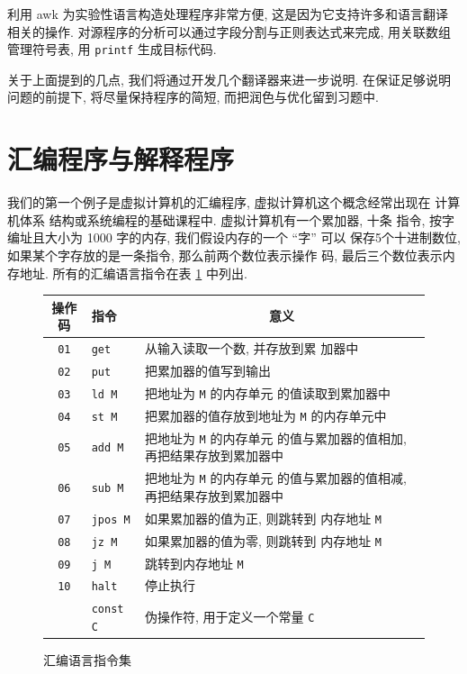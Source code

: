 利用 awk 为实验性语言构造处理程序非常方便, 这是因为它支持许多和语言翻译
相关的操作. 对源程序的分析可以通过字段分割与正则表达式来完成, 用关联数组
管理符号表, 用 \texttt{printf} 生成目标代码.

关于上面提到的几点, 我们将通过开发几个翻译器来进一步说明. 在保证足够说明
问题的前提下,  将尽量保持程序的简短, 而把润色与优化留到习题中.

\section{汇编程序与解释程序}
\label{subsec:an_assembler_and_interpreter}

我们的第一个例子是虚拟计算机的汇编程序, 虚拟计算机这个概念经常出现在
计算机体系 结构或系统编程的基础课程中. 虚拟计算机有一个累加器, 十条
指令, 按字编址且大小为 1000 字的内存, 我们假设内存的一个 ``字'' 可以
保存5个十进制数位, 如果某个字存放的是一条指令, 那么前两个数位表示操作
码, 最后三个数位表示内存地址. 所有的汇编语言指令在表
\ref{tbl:assembly_language_instructions} 中列出.
\begin{figure}[ht]
\captionsetup{type=table}
\caption{汇编语言指令集}
\label{tbl:assembly_language_instructions}
\begin{center}
    \begin{tabular}{c|l|l}
        \hline
        \hline
        操作码          & 指令    &
        \multicolumn{1}{c}{意义}  \\
        \hline
        \texttt{01}     & \texttt{get}  & 从输入读取一个数, 并存放到累
        加器中 \\
        \texttt{02}     & \texttt{put}  & 把累加器的值写到输出 \\
        \texttt{03}     & \texttt{ld M}  & 把地址为 \texttt{M} 的内存单元
        的值读取到累加器中 \\
        \texttt{04}     & \texttt{st M}  & 把累加器的值存放到地址为 
        \texttt{M} 的内存单元中 \\
        \texttt{05}     & \texttt{add M} & 把地址为 \texttt{M} 的内存单元 
        的值与累加器的值相加, 再把结果存放到累加器中 \\
        \texttt{06}     & \texttt{sub M} & 把地址为 \texttt{M} 的内存单元 
        的值与累加器的值相减, 再把结果存放到累加器中 \\
        \texttt{07}     & \texttt{jpos M} & 如果累加器的值为正, 则跳转到
        内存地址 \texttt{M} \\
        \texttt{08}     & \texttt{jz M} & 如果累加器的值为零, 则跳转到 
        内存地址 \texttt{M}     \\
        \texttt{09}     & \texttt{j M}  & 跳转到内存地址 \texttt{M} \\
        \texttt{10}     & \texttt{halt} & 停止执行 \\
                        & \texttt{const C} & 伪操作符, 用于定义一个常量
                        \texttt{C} \\
        \hline
    \end{tabular}
\end{center}
\end{figure}

